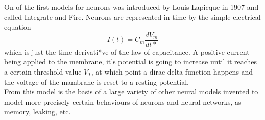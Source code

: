 On of the first models for neurons was introduced by Louis Lapicque in 1907 and called Integrate and Fire. Neurons are represented in time by the simple electrical equation
	\begin{equation}
		I(t)=C_m\frac{dV_m}{dt*}
	\end{equation}
which is just the time derivati*ve of the law of capacitance. A positive current being applied to the membrane, it's potential is going to increase until it reaches a certain threshold value $V_T$, at which point a dirac delta function happens and the voltage of the mambrane is reset to a resting potential.\\
From this model is the basis of a large variety of other neural models invented to model more precisely certain behaviours of neurons and neural networks, as memory, leaking, etc.